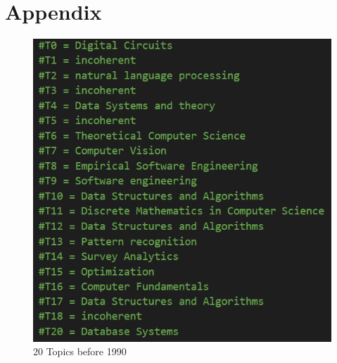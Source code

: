 \documentclass[fleqn,10pt]{SelfArx} %
\begin{document}
\section{Appendix}

\begin{figure}[ht]\centering
	\includegraphics[width=\linewidth]{Figures/before 199Topics.png}
	\caption{20 Topics before 1990}
	\label{fig:ap1990}
\end{figure}
\end{document}

